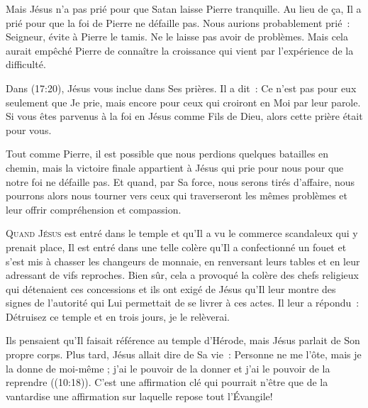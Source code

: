 Mais Jésus n'a pas prié pour que Satan laisse Pierre tranquille.
 Au lieu de ça, Il a prié pour que la foi de Pierre ne défaille pas.
 Nous aurions probablement prié~: \og Seigneur, évite à Pierre le tamis.
 Ne le laisse pas avoir de problèmes. \fg{}
 Mais cela aurait empêché Pierre de connaître la croissance qui vient
 par l'expérience de la difficulté.


Dans (17:20), Jésus vous inclue dans Ses prières.
 Il a dit~: 
 \og Ce n'est pas pour eux seulement que Je prie, mais encore pour ceux
 qui croiront en Moi par leur parole. \fg{}
 Si vous êtes parvenus à la foi en Jésus comme Fils de Dieu,
 alors cette prière était pour vous.

Tout comme Pierre, il est possible que nous perdions quelques batailles
 en chemin, mais la victoire  finale appartient à Jésus
 qui prie pour nous pour que notre foi ne défaille pas.
 Et quand, par Sa force, nous serons tirés d'affaire,
 nous pourrons alors nous tourner vers ceux qui traverseront
 les mêmes problèmes et leur offrir compréhension et compassion.

\dvrule






\lettrine{Q}{uand Jésus} est entré dans le temple et qu'Il a vu le commerce
 scandaleux qui y prenait place, Il est entré dans une telle colère
 qu'Il a confectionné un fouet et s'est mis à chasser les changeurs
 de monnaie, en renversant leurs tables et en leur adressant
 de vifs reproches. Bien sûr, cela a provoqué la colère des chefs religieux
 qui détenaient ces concessions et ils ont exigé de Jésus
 qu'Il leur montre des signes de l'autorité qui Lui permettait
 de se livrer à ces actes. Il leur a répondu~: 
 \og Détruisez ce temple et en trois jours, je le relèverai. \fg{}

Ils pensaient qu'Il faisait référence au temple d'Hérode,
 mais Jésus parlait de Son propre corps.
 Plus tard, Jésus allait dire de Sa vie~: 
 \og Personne ne me l'ôte, mais je la donne de moi-même ;
 j'ai le pouvoir de la donner et j'ai le pouvoir de la reprendre \fg{}
 ((10:18)).
 C'est une affirmation clé qui pourrait n'être que de la vantardise
 \ocadr une affirmation sur laquelle repose tout l'Évangile! 

